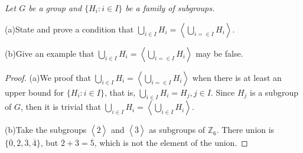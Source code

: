 \begin{problem}\em
Let $G$ be a group and $\{H_i:i\in I\}$ be a family of subgroups.\par
(a)State and prove a condition that $\bigcup_{i\in I}H_i=\left<\bigcup_{i=\in I}H_i\right>$.\par
(b)Give an example that $\bigcup_{i\in I}H_i=\left<\bigcup_{i=\in I}H_i\right>$ may be false.
\end{problem}
\begin{proof}
(a)We proof that $\bigcup_{i\in I}H_i=\left<\bigcup_{i=\in I}H_i\right>$ when there is at least an upper bound for $\{H_i:i\in I\}$, that is, $\bigcup_{i\in I}H_i=H_j,j\in I$. Since $H_j$ is a subgroup of $G$, then it is trivial that $\bigcup_{i\in I}H_i=\left<\bigcup_{i\in I}H_i\right>$.\par
(b)Take the subgroups $\left<\overline{2}\right>$ and $\left<\overline{3}\right>$ as subgroups of $\mathbb{Z}_6$. There union is $\{\overline{0},\overline{2},\overline{3},\overline{4}\}$, but $\overline{2}+\overline{3}=\overline{5}$, which is not the element of the union.
\end{proof}
